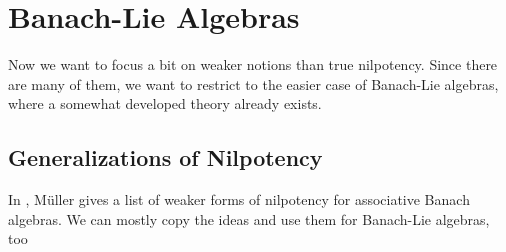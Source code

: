 \section{Banach-Lie Algebras}
\label{sec:chap6_TheEProperty}

Now we want to focus a bit on weaker notions than true nilpotency. Since there 
are many of them, we want to restrict to the easier case of Banach-Lie algebras, 
where a somewhat developed theory already exists.


\subsection{Generalizations of Nilpotency}

In \cite{mueller:1994a}, M\"uller gives a list of weaker forms of nilpotency for 
associative Banach algebras. We can mostly copy the ideas and use them for 
Banach-Lie algebras, too
